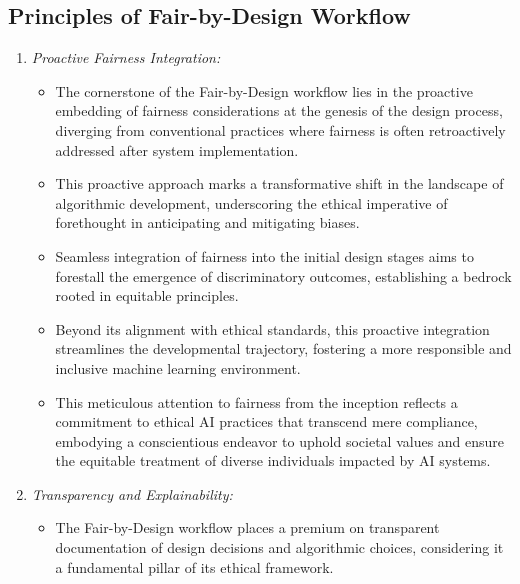 \subsection{Principles of Fair-by-Design Workflow}
\label{subsection:workflow-principles}

\begin{enumerate}[label=\arabic*.]
    \item \emph{Proactive Fairness Integration:}
    
    \begin{itemize}
       
        \item The cornerstone of the Fair-by-Design workflow lies in the proactive embedding of fairness considerations at the genesis of the design process, diverging from conventional practices where fairness is often retroactively addressed after system implementation.
        
        \item This proactive approach marks a transformative shift in the landscape of algorithmic development, underscoring the ethical imperative of forethought in anticipating and mitigating biases.
        
        \item Seamless integration of fairness into the initial design stages aims to forestall the emergence of discriminatory outcomes, establishing a bedrock rooted in equitable principles.
        
        \item Beyond its alignment with ethical standards, this proactive integration streamlines the developmental trajectory, fostering a more responsible and inclusive machine learning environment.
       
        \item This meticulous attention to fairness from the inception reflects a commitment to ethical AI practices that transcend mere compliance, embodying a conscientious endeavor to uphold societal values and ensure the equitable treatment of diverse individuals impacted by AI systems.
   
    \end{itemize}

    \item \emph{Transparency and Explainability:}
    
    \begin{itemize}
        
        \item The Fair-by-Design workflow places a premium on transparent documentation of design decisions and algorithmic choices, considering it a fundamental pillar of its ethical framework.
       

\end{itemize}
\end{enumerate}
